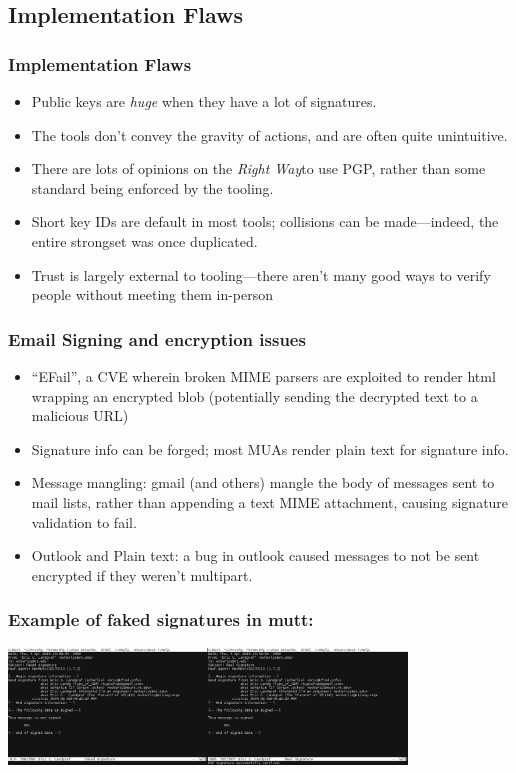 \documentclass[aspectratio=1610,bigger,utf8]{beamer}
\begin{document}
\subsection{Implementation Flaws}
\begin{frame}
	\frametitle{Implementation Flaws}
	\begin{itemize}
		\item Public keys are \emph{huge} when they have a lot of
			signatures.
		\item The tools don't convey the gravity of actions, and are
			often quite unintuitive.
		\item There are lots of opinions on the \emph{Right
			Way}\texttrademark to use PGP, rather than some
			standard being enforced by the tooling.
		\item Short key IDs are default in most tools; collisions can
			be made---indeed, the entire strongset was once duplicated.
		\item Trust is largely external to tooling---there aren't many
			good ways to verify people without meeting them
			in-person
	\end{itemize}
\end{frame}
\begin{frame}
	\frametitle{Email Signing and encryption issues}
	\begin{itemize}
		\item ``EFail'', a CVE wherein broken MIME parsers are
			exploited to render html wrapping an encrypted blob
			(potentially sending the decrypted text to a malicious
			URL)
		\item Signature info can be forged; most MUAs render plain text
			for signature info.
		\item Message mangling: gmail (and others) mangle the body of
			messages sent to mail lists, rather than appending a
			text MIME attachment, causing signature validation to
			fail.
		\item Outlook and Plain text: a bug in outlook caused messages
			to not be sent encrypted if they weren't multipart.
	\end{itemize}
\end{frame}
\begin{frame}
	\frametitle{Example of faked signatures in mutt:}
	\begin{center}
		\includegraphics[width=400px]{mutt}
	\end{center}
\end{frame}
\end{document}
